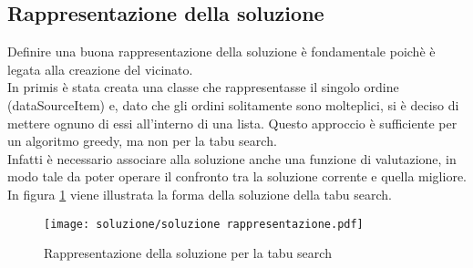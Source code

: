 \newpage

\subsection{Rappresentazione della soluzione}
\label{sec:rappresentazione-della-soluzione}
\noindent Definire una buona rappresentazione della soluzione è fondamentale
poichè è legata alla creazione del vicinato.\\
In primis è stata creata una classe che rappresentasse
il singolo ordine (dataSourceItem) e, dato che gli ordini solitamente sono molteplici,
si è deciso di mettere ognuno di essi all'interno di una lista.
Questo approccio è sufficiente per un algoritmo greedy, ma non per la tabu search.\\
Infatti è necessario associare alla soluzione anche una funzione di valutazione, in modo tale
da poter operare il confronto tra la soluzione corrente e quella migliore.\\
In figura \ref{rappresentazione-soluzione} viene illustrata la forma della soluzione della tabu search.
\begin{figure}[!h] 
    \centering 
    \texttt{[image: soluzione/soluzione rappresentazione.pdf]} 
    \caption{Rappresentazione della soluzione per la tabu search}
    \label{rappresentazione-soluzione}
\end{figure}

